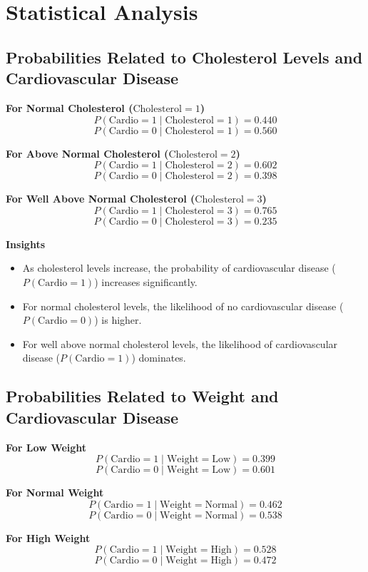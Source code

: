 \documentclass[12pt]{article}
\begin{document}
\section{Statistical Analysis}
\subsection {Probabilities Related to Cholesterol Levels and Cardiovascular Disease}

\textbf{For Normal Cholesterol (\( \text{Cholesterol} = 1 \))}
\[
P(\text{Cardio} = 1 \mid \text{Cholesterol} = 1) = 0.440
\]
\[
P(\text{Cardio} = 0 \mid \text{Cholesterol} = 1) = 0.560
\]

\textbf{For Above Normal Cholesterol (\( \text{Cholesterol} = 2 \))}
\[
P(\text{Cardio} = 1 \mid \text{Cholesterol} = 2) = 0.602
\]
\[
P(\text{Cardio} = 0 \mid \text{Cholesterol} = 2) = 0.398
\]

\textbf{For Well Above Normal Cholesterol (\( \text{Cholesterol} = 3 \))}
\[
P(\text{Cardio} = 1 \mid \text{Cholesterol} = 3) = 0.765
\]
\[
P(\text{Cardio} = 0 \mid \text{Cholesterol} = 3) = 0.235
\]

\textbf{Insights}
\begin{itemize}
    \item As cholesterol levels increase, the probability of cardiovascular disease (\( P(\text{Cardio} = 1) \)) increases significantly.
    \item For normal cholesterol levels, the likelihood of no cardiovascular disease (\( P(\text{Cardio} = 0) \)) is higher.
    \item For well above normal cholesterol levels, the likelihood of cardiovascular disease (\( P(\text{Cardio} = 1) \)) dominates.
\end{itemize}


\subsection{Probabilities Related to Weight and Cardiovascular Disease}

\textbf{For Low Weight}
\[
P(\text{Cardio} = 1 \mid \text{Weight} = \text{Low}) = 0.399
\]
\[
P(\text{Cardio} = 0 \mid \text{Weight} = \text{Low}) = 0.601
\]

\textbf{For Normal Weight}
\[
P(\text{Cardio} = 1 \mid \text{Weight} = \text{Normal}) = 0.462
\]
\[
P(\text{Cardio} = 0 \mid \text{Weight} = \text{Normal}) = 0.538
\]

\textbf{For High Weight}
\[
P(\text{Cardio} = 1 \mid \text{Weight} = \text{High}) = 0.528
\]
\[
P(\text{Cardio} = 0 \mid \text{Weight} = \text{High}) = 0.472
\]
\end{document}
